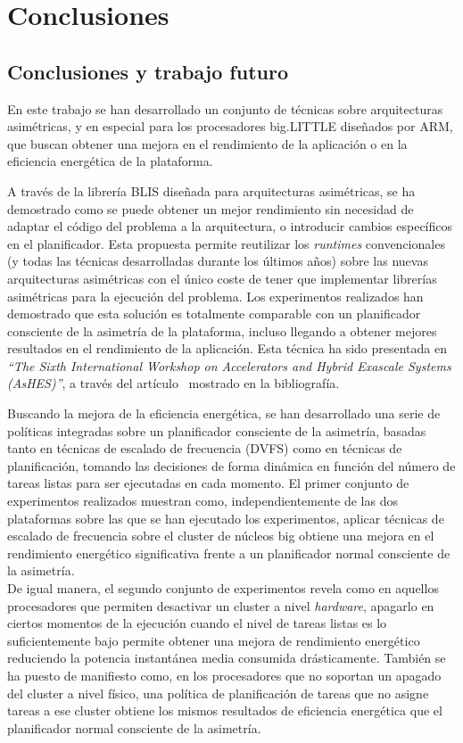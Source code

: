 \cleardoublepage

\chapter{Conclusiones}
\label{ch:chapter6}

\section{Conclusiones y trabajo futuro}

En este trabajo se han desarrollado un conjunto de técnicas sobre
arquitecturas asimétricas, y en especial para los procesadores big.LITTLE
diseñados por ARM, que buscan obtener una mejora en el rendimiento de la
aplicación o en la eficiencia energética de la plataforma.


A través de la librería BLIS diseñada para arquitecturas asimétricas, se ha
demostrado como se puede obtener un mejor rendimiento sin necesidad de
adaptar el código del problema a la arquitectura, o introducir cambios
específicos en el planificador. Esta propuesta permite reutilizar los
\emph{runtimes} convencionales (y todas las técnicas desarrolladas durante
los últimos años) sobre las nuevas arquitecturas asimétricas con el único
coste de tener que implementar librerías asimétricas para la ejecución del
problema. Los experimentos realizados han demostrado que esta solución es
totalmente comparable con un planificador consciente de la asimetría de la
plataforma, incluso llegando a obtener mejores resultados en el rendimiento
de la aplicación. Esta técnica ha sido presentada en \emph{``The Sixth
  International Workshop on Accelerators and Hybrid Exascale Systems
  (AsHES)''}, a través del artículo~\cite{ashes} mostrado en la
bibliografía.


Buscando la mejora de la eficiencia energética, se han desarrollado una
serie de políticas integradas sobre un planificador consciente de la
asimetría, basadas tanto en técnicas de escalado de frecuencia (DVFS) como
en técnicas de planificación, tomando las decisiones de forma dinámica en
función del número de tareas listas para ser ejecutadas en cada momento. El
primer conjunto de experimentos realizados muestran como,
independientemente de las dos plataformas sobre las que se han ejecutado
los experimentos, aplicar técnicas de escalado de frecuencia sobre el
cluster de núcleos big obtiene una mejora en el rendimiento energético
significativa frente a un planificador normal consciente de la
asimetría.\\
De igual manera, el segundo conjunto de experimentos revela como en
aquellos procesadores que permiten desactivar un cluster a nivel
\emph{hardware}, apagarlo en ciertos momentos de la ejecución cuando el
nivel de tareas listas es lo suficientemente bajo permite obtener una
mejora de rendimiento energético reduciendo la potencia instantánea media
consumida drásticamente. También se ha puesto de manifiesto como, en los
procesadores que no soportan un apagado del cluster a nivel físico, una
política de planificación de tareas que no asigne tareas a ese cluster
obtiene los mismos resultados de eficiencia energética que el planificador
normal consciente de la asimetría.


